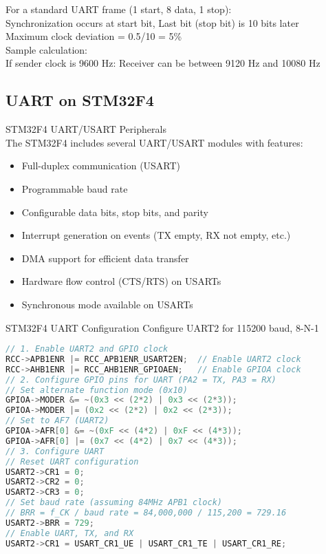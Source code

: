 \begin{example}
    For a standard UART frame (1 start, 8 data, 1 stop):\\
    Synchronization occurs at start bit,
    Last bit (stop bit) is 10 bits later\\
    Maximum clock deviation = 0.5/10 = 5\%\\
    Sample calculation:\\
    If sender clock is 9600 Hz: Receiver can be between 9120 Hz and 10080 Hz
\end{example}

\multend


\subsection{UART on STM32F4}

\begin{concept}{STM32F4 UART/USART Peripherals}\\
The STM32F4 includes several UART/USART modules with features:
\begin{itemize}
    \item Full-duplex communication (USART)
    \item Programmable baud rate
    \item Configurable data bits, stop bits, and parity
    \item Interrupt generation on events (TX empty, RX not empty, etc.)
    \item DMA support for efficient data transfer
    \item Hardware flow control (CTS/RTS) on USARTs
    \item Synchronous mode available on USARTs
\end{itemize}
\end{concept}

\begin{code}{STM32F4 UART Configuration} Configure UART2 for 115200 baud, 8-N-1
\begin{lstlisting}[language=C, style=basesmol]
// 1. Enable UART2 and GPIO clock
RCC->APB1ENR |= RCC_APB1ENR_USART2EN;  // Enable UART2 clock
RCC->AHB1ENR |= RCC_AHB1ENR_GPIOAEN;   // Enable GPIOA clock
// 2. Configure GPIO pins for UART (PA2 = TX, PA3 = RX)
// Set alternate function mode (0x10)
GPIOA->MODER &= ~(0x3 << (2*2) | 0x3 << (2*3));
GPIOA->MODER |= (0x2 << (2*2) | 0x2 << (2*3));
// Set to AF7 (UART2)
GPIOA->AFR[0] &= ~(0xF << (4*2) | 0xF << (4*3));
GPIOA->AFR[0] |= (0x7 << (4*2) | 0x7 << (4*3));
// 3. Configure UART
// Reset UART configuration
USART2->CR1 = 0;
USART2->CR2 = 0;
USART2->CR3 = 0;
// Set baud rate (assuming 84MHz APB1 clock)
// BRR = f_CK / baud rate = 84,000,000 / 115,200 = 729.16
USART2->BRR = 729;
// Enable UART, TX, and RX
USART2->CR1 = USART_CR1_UE | USART_CR1_TE | USART_CR1_RE;
\end{lstlisting}
\end{code}

